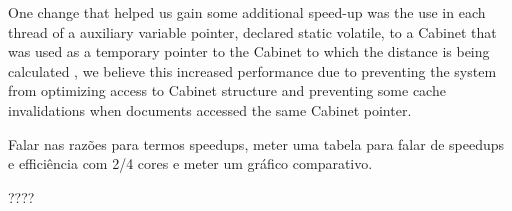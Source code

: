 \documentclass[times, 10pt,twocolumn]{article}
\begin{document}
One change that helped us gain some additional speed-up was the use in each thread of a auxiliary variable pointer, declared static volatile, to a Cabinet that was used as a temporary pointer to the Cabinet to which the distance is being calculated , we believe this increased performance due to preventing the system from optimizing access to Cabinet structure and preventing some cache invalidations when documents accessed the same Cabinet pointer.



Falar nas razões para termos speedups, meter uma tabela para falar de speedups e efficiência com 2/4 cores e meter um gráfico comparativo.



????

\end{document}
